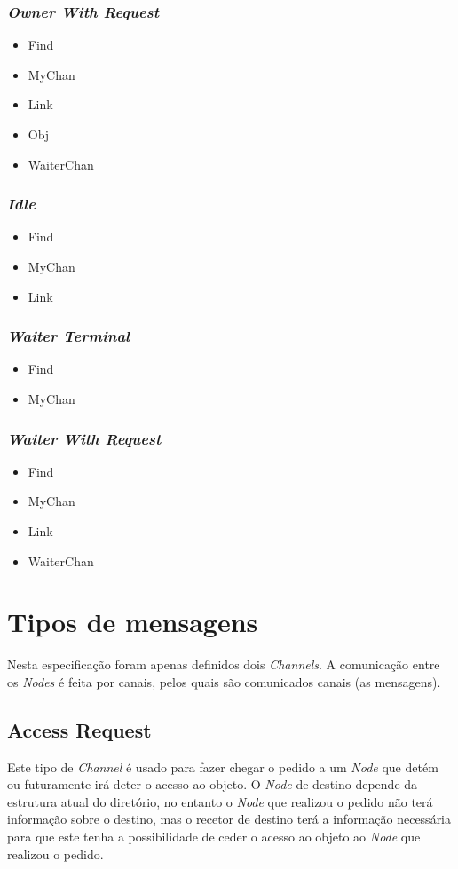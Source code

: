 \subsubsection*{\emph{Owner With Request}}
\begin{itemize}
    \item Find
    \item MyChan
    \item Link
    \item Obj
    \item WaiterChan
\end{itemize}
\subsubsection*{\emph{Idle}}
\begin{itemize}
    \item Find
    \item MyChan
    \item Link
\end{itemize}
\subsubsection*{\emph{Waiter Terminal}}
\begin{itemize}
    \item Find
    \item MyChan
\end{itemize}
\subsubsection*{\emph{Waiter With Request}}
\begin{itemize}
    \item Find 
    \item MyChan 
    \item Link 
    \item WaiterChan 
\end{itemize}



\section{Tipos de mensagens}
\label{especificacao:sec:Channels}
Nesta especificação foram apenas definidos dois \emph{Channels}. A comunicação entre os \emph{Nodes} é feita por canais, pelos quais são comunicados canais (as mensagens).


\subsection*{Access Request}
Este tipo de \emph{Channel} é usado para fazer chegar o pedido a um \emph{Node} que detém ou futuramente irá deter o acesso ao objeto. O \emph{Node} de destino depende da estrutura atual do diretório, no entanto o \emph{Node} que realizou o pedido não terá informação sobre o destino, mas o recetor de destino terá a informação necessária para que este tenha a possibilidade de ceder o acesso ao objeto ao \emph{Node} que realizou o pedido.

